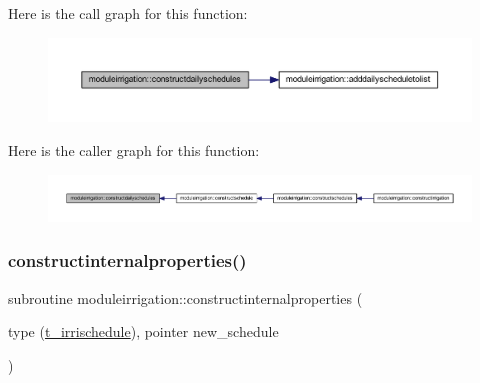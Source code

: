 Here is the call graph for this function\+:\nopagebreak
\begin{figure}[H]
\begin{center}
\leavevmode
\includegraphics[width=350pt]{namespacemoduleirrigation_af6e24627c25064683d994b7a6fc66c6d_cgraph}
\end{center}
\end{figure}
Here is the caller graph for this function\+:\nopagebreak
\begin{figure}[H]
\begin{center}
\leavevmode
\includegraphics[width=350pt]{namespacemoduleirrigation_af6e24627c25064683d994b7a6fc66c6d_icgraph}
\end{center}
\end{figure}
\mbox{\label{namespacemoduleirrigation_ab5de3f1600faba7f4c6ae843ce15e5e3}} 
\subsubsection{\texorpdfstring{constructinternalproperties()}{constructinternalproperties()}}
{\footnotesize\ttfamily subroutine moduleirrigation\+::constructinternalproperties (\begin{DoxyParamCaption}\item[{type (\mbox{\hyperlink{structmoduleirrigation_1_1t__irrischedule}{t\+\_\+irrischedule}}), pointer}]{new\+\_\+schedule }\end{DoxyParamCaption})\hspace{0.3cm}{\ttfamily [private]}}


